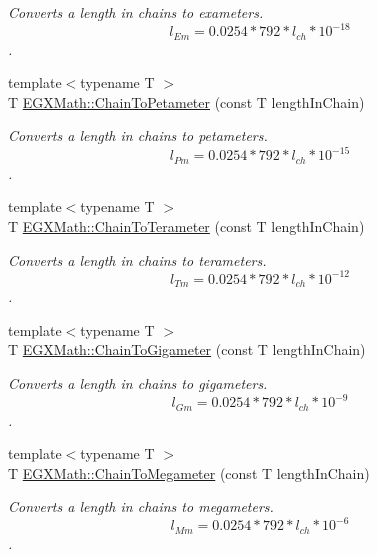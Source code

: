 \begin{DoxyCompactItemize}
\begin{DoxyCompactList}\small\item\em Converts a length in chains to exameters. \[ l_{Em}=0.0254 * 792 * l_{ch} * 10^{-18} \]. \end{DoxyCompactList}\item 
{\footnotesize template$<$typename T $>$ }\\T \mbox{\hyperlink{group___e_g_x_math-_conversions-_length_conversions-_imperial-_chain-_s_i_ga4a40c43d2437af26f04a678f438451ce}{E\+G\+X\+Math\+::\+Chain\+To\+Petameter}} (const T length\+In\+Chain)
\begin{DoxyCompactList}\small\item\em Converts a length in chains to petameters. \[ l_{Pm}=0.0254 * 792 * l_{ch} * 10^{-15} \]. \end{DoxyCompactList}\item 
{\footnotesize template$<$typename T $>$ }\\T \mbox{\hyperlink{group___e_g_x_math-_conversions-_length_conversions-_imperial-_chain-_s_i_ga8940f5211af58a3bf708412ad2d7ba96}{E\+G\+X\+Math\+::\+Chain\+To\+Terameter}} (const T length\+In\+Chain)
\begin{DoxyCompactList}\small\item\em Converts a length in chains to terameters. \[ l_{Tm}=0.0254 * 792 * l_{ch} * 10^{-12} \]. \end{DoxyCompactList}\item 
{\footnotesize template$<$typename T $>$ }\\T \mbox{\hyperlink{group___e_g_x_math-_conversions-_length_conversions-_imperial-_chain-_s_i_ga4e3a17428c28a61c1aaf1de8c094f31d}{E\+G\+X\+Math\+::\+Chain\+To\+Gigameter}} (const T length\+In\+Chain)
\begin{DoxyCompactList}\small\item\em Converts a length in chains to gigameters. \[ l_{Gm}=0.0254 * 792 * l_{ch} * 10^{-9} \]. \end{DoxyCompactList}\item 
{\footnotesize template$<$typename T $>$ }\\T \mbox{\hyperlink{group___e_g_x_math-_conversions-_length_conversions-_imperial-_chain-_s_i_gad564a80fe3ce7cb8c129758004256a12}{E\+G\+X\+Math\+::\+Chain\+To\+Megameter}} (const T length\+In\+Chain)
\begin{DoxyCompactList}\small\item\em Converts a length in chains to megameters. \[ l_{Mm}=0.0254 * 792 * l_{ch} * 10^{-6} \]. \end{DoxyCompactList}\item 

\end{DoxyCompactItemize}
